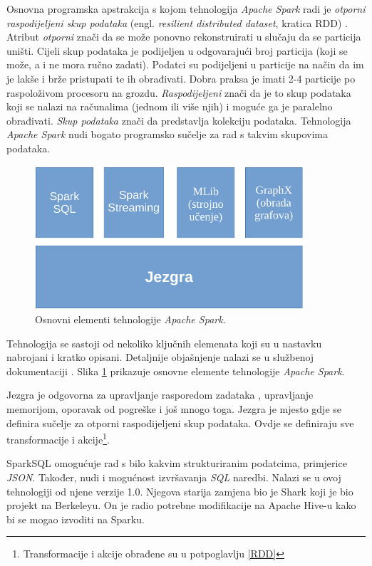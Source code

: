\documentclass[times, utf8, zavrsni, numeric]{fer}
\begin{document}
Osnovna programska apstrakcija s kojom tehnologija \emph{Apache Spark} radi je \emph{otporni raspodijeljeni skup podataka} (engl. \emph{resilient distributed dataset}, kratica RDD) \cite{workingSets}.
Atribut \emph{otporni} znači da se može ponovno rekonstruirati u slučaju da se particija uništi. Cijeli skup podataka je podijeljen u odgovarajući broj particija (koji se može, a i ne mora ručno zadati). Podatci su podijeljeni u particije na način da im je lakše i brže pristupati te ih obrađivati. Dobra praksa je imati 2-4 particije po raspoloživom procesoru na grozdu. \emph{Raspodijeljeni} znači da je to skup podataka koji se nalazi na računalima (jednom ili više njih) i moguće ga je paralelno obrađivati. \emph{Skup podataka} znači da predstavlja kolekciju podataka. Tehnologija \emph{Apache Spark} nudi bogato programsko sučelje za rad s takvim skupovima podataka.

\vspace{5mm}
\begin{figure}[htb]
\centering
\includegraphics[width=10cm]{img/gradivniElementiCropped.pdf}
\caption{Osnovni elementi tehnologije \emph{Apache Spark}.}
\label{fig:spark-stack}
\end{figure}


Tehnologija se sastoji od nekoliko ključnih elemenata koji su u nastavku nabrojani i kratko opisani. Detaljnije objašnjenje nalazi se u službenoj dokumentaciji \cite{officialDocumentation}. Slika \ref{fig:spark-stack} prikazuje osnovne elemente tehnologije \emph{Apache Spark}.

Jezgra je odgovorna za upravljanje rasporedom zadataka , upravljanje memorijom, oporavak od pogreške i još mnogo toga. Jezgra je mjesto gdje se definira sučelje za otporni raspodijeljeni skup podataka. Ovdje se definiraju sve transformacije i akcije\footnote{Transformacije i akcije obrađene su u potpoglavlju \ref{RDD}}.   

SparkSQL omogućuje rad s bilo kakvim strukturiranim podatcima, primjerice \emph{JSON}. Također, nudi i mogućnost izvršavanja \emph{SQL} naredbi. Nalazi se u ovoj tehnologiji od njene verzije 1.0. Njegova starija zamjena bio je Shark koji je bio projekt na Berkeleyu. On je radio potrebne modifikacije na Apache Hive-u kako bi se mogao izvoditi na Sparku.
\end{document}
